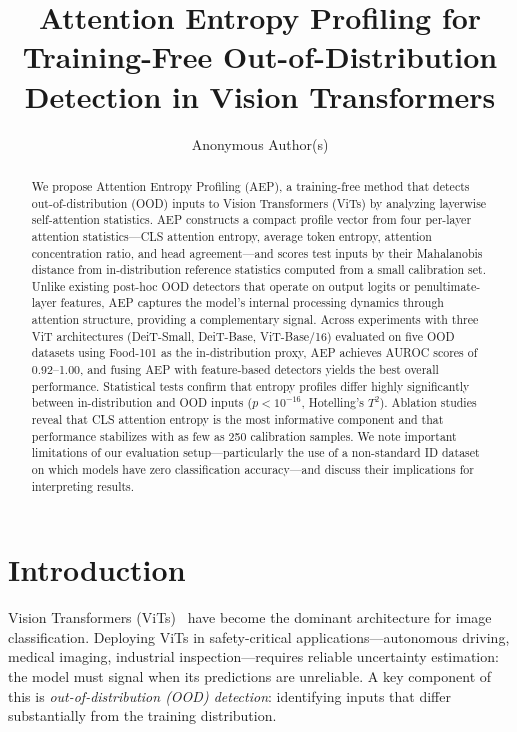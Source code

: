 \documentclass{article}
\title{Attention Entropy Profiling for Training-Free Out-of-Distribution Detection in Vision Transformers}
\author{
  Anonymous Author(s)
}
\newcommand{\AEP}{\textsc{AEP}}
\begin{document}
\maketitle

\begin{abstract}
We propose Attention Entropy Profiling (\AEP{}), a training-free method that detects out-of-distribution (OOD) inputs to Vision Transformers (ViTs) by analyzing layerwise self-attention statistics. \AEP{} constructs a compact profile vector from four per-layer attention statistics---CLS attention entropy, average token entropy, attention concentration ratio, and head agreement---and scores test inputs by their Mahalanobis distance from in-distribution reference statistics computed from a small calibration set. Unlike existing post-hoc OOD detectors that operate on output logits or penultimate-layer features, \AEP{} captures the model's internal processing dynamics through attention structure, providing a complementary signal. Across experiments with three ViT architectures (DeiT-Small, DeiT-Base, ViT-Base/16) evaluated on five OOD datasets using Food-101 as the in-distribution proxy, \AEP{} achieves AUROC scores of 0.92--1.00, and fusing \AEP{} with feature-based detectors yields the best overall performance. Statistical tests confirm that entropy profiles differ highly significantly between in-distribution and OOD inputs ($p < 10^{-16}$, Hotelling's $T^2$). Ablation studies reveal that CLS attention entropy is the most informative component and that performance stabilizes with as few as 250 calibration samples. We note important limitations of our evaluation setup---particularly the use of a non-standard ID dataset on which models have zero classification accuracy---and discuss their implications for interpreting results.
\end{abstract}

\section{Introduction}

Vision Transformers (ViTs)~\citep{dosovitskiy2021an} have become the dominant architecture for image classification. Deploying ViTs in safety-critical applications---autonomous driving, medical imaging, industrial inspection---requires reliable uncertainty estimation: the model must signal when its predictions are unreliable. A key component of this is \emph{out-of-distribution (OOD) detection}: identifying inputs that differ substantially from the training distribution.
\end{document}
